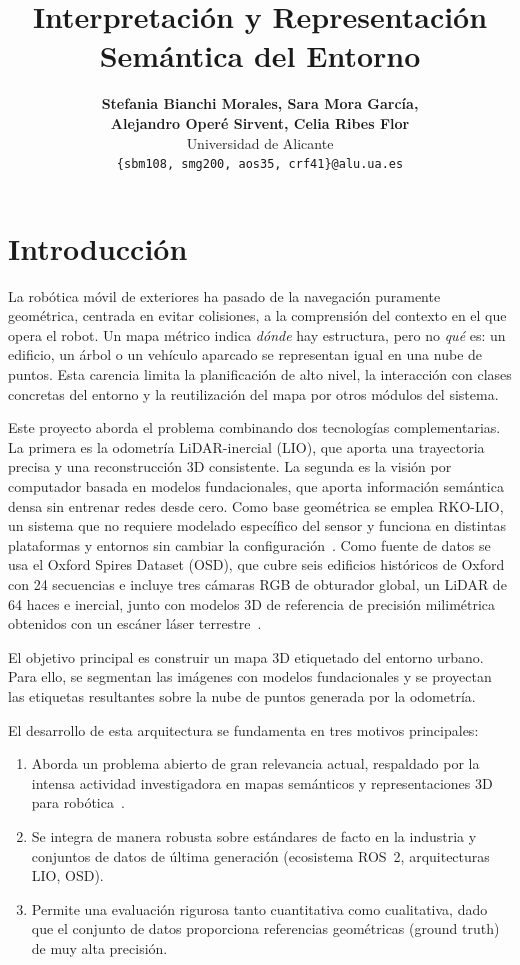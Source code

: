 \documentclass[11pt, twoside]{article}
\title{Interpretación y Representación Semántica del Entorno}
\author{
  \textbf{Stefania Bianchi Morales, Sara Mora García,}\\
  \textbf{Alejandro Operé Sirvent, Celia Ribes Flor}\\[0.3cm]
  Universidad de Alicante\\
  \texttt{\{sbm108, smg200, aos35, crf41\}@alu.ua.es}
}
\begin{document}
\maketitle
\thispagestyle{firstpage}

\begin{abstract}
\end{abstract}

\section{Introducción}
La robótica móvil de exteriores ha pasado de la navegación puramente geométrica, centrada en evitar colisiones, a la comprensión del contexto en el que opera el robot. Un mapa métrico indica \emph{dónde} hay estructura, pero no \emph{qué} es: un edificio, un árbol o un vehículo aparcado se representan igual en una nube de puntos. Esta carencia limita la planificación de alto nivel, la interacción con clases concretas del entorno y la reutilización del mapa por otros módulos del sistema.

Este proyecto aborda el problema combinando dos tecnologías complementarias. La primera es la odometría LiDAR-inercial (LIO), que aporta una trayectoria precisa y una reconstrucción 3D consistente. La segunda es la visión por computador basada en modelos fundacionales, que aporta información semántica densa sin entrenar redes desde cero. Como base geométrica se emplea RKO-LIO, un sistema que no requiere modelado específico del sensor y funciona en distintas plataformas y entornos sin cambiar la configuración~\cite{malladi2026rkolio}. Como fuente de datos se usa el Oxford Spires Dataset (OSD), que cubre seis edificios históricos de Oxford con 24 secuencias e incluye tres cámaras RGB de obturador global, un LiDAR de 64 haces e inercial, junto con modelos 3D de referencia de precisión milimétrica obtenidos con un escáner láser terrestre~\cite{tao2024spires}.
 
El objetivo principal es construir un mapa 3D etiquetado del entorno urbano. Para ello, se segmentan las imágenes con modelos fundacionales y se proyectan las etiquetas resultantes sobre la nube de puntos generada por la odometría. 
 
El desarrollo de esta arquitectura se fundamenta en tres motivos principales:
\begin{enumerate}[noitemsep]
  \item Aborda un problema abierto de gran relevancia actual, respaldado por la intensa actividad investigadora en mapas semánticos y representaciones 3D para robótica~\cite{firoozi2023foundation,deng2025best3d}.
  \item Se integra de manera robusta sobre estándares de facto en la industria y conjuntos de datos de última generación (ecosistema ROS~2, arquitecturas LIO, OSD).
  \item Permite una evaluación rigurosa tanto cuantitativa como cualitativa, dado que el conjunto de datos proporciona referencias geométricas (ground truth) de muy alta precisión.
\end{enumerate}
\end{document}
